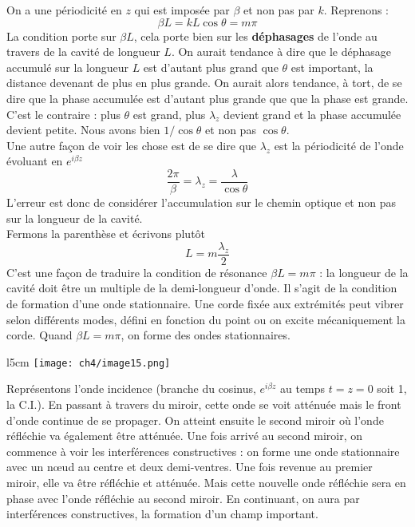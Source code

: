 On a une périodicité en $z$ qui est imposée par $\beta$ et non pas par $k$. Reprenons :
\begin{equation}
\beta L = kL\cos\theta = m\pi
\end{equation}
La condition porte sur $\beta L$, cela porte bien sur les \textbf{déphasages} de l'onde au 
travers de la cavité de longueur $L$. On aurait tendance à dire que le déphasage accumulé 
sur la longueur $L$ est d'autant plus grand que $\theta$ est important, la distance devenant 
de plus en plus grande. On aurait alors tendance, à tort, de se dire que la phase accumulée est 
d'autant plus grande que que la phase est grande. C'est le contraire : plus $\theta$ est grand, 
plus $\lambda_z$ devient grand et la phase accumulée devient petite. Nous avons bien $1/ \cos\theta$ 
et non pas $\cos\theta$.\\

Une autre façon de voir les chose est de se dire que $\lambda_z$ est la périodicité de l'onde 
évoluant en $e^{i\beta z}$
\begin{equation}
\frac{2\pi}{\beta} = \lambda_z = \frac{\lambda}{\cos\theta}
\end{equation}
L'erreur est donc de considérer l'accumulation sur le chemin optique et non pas sur la longueur 
de la cavité.\\

Fermons la parenthèse et écrivons plutôt
\begin{equation}
L = m\frac{\lambda_z}{2}
\end{equation}
C'est une façon de traduire la condition de résonance $\beta L = m\pi$ : la longueur de la cavité 
doit être un multiple de la demi-longueur d'onde. Il s'agit de la condition de formation d'une onde 
stationnaire. Une corde fixée aux extrémités peut vibrer selon différents modes, défini en fonction 
du point ou on excite mécaniquement la corde. Quand $\beta L = m\pi$, on forme des ondes stationnaires.\\

	\begin{wrapfigure}[9]{l}{5cm}
	\vspace{-5mm}
	\texttt{[image: ch4/image15.png]}
	\end{wrapfigure}
Représentons l'onde incidence (branche du cosinus, $e^{i\beta z}$ au temps $t=z=0$ soit 1, la C.I.). En 
passant à travers du miroir, cette onde se voit atténuée mais le front d'onde continue de se propager. 
On atteint ensuite le second miroir où l'onde réfléchie va également être atténuée. Une fois arrivé au 
second miroir, on commence à voir les interférences constructives : on forme une onde stationnaire avec 
un nœud au centre et deux demi-ventres. Une fois revenue au premier miroir, elle va être réfléchie et 
atténuée. Mais cette nouvelle onde réfléchie sera en phase avec l'onde réfléchie au second miroir. 
En continuant, on aura par interférences constructives, la formation d'un champ important.\\%


